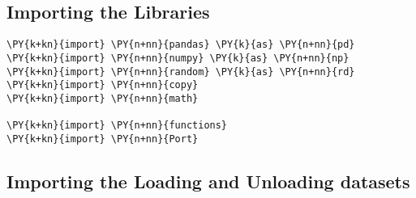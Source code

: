 \sloppy
\hypersetup{
  breaklinks=true,  %
  colorlinks=true,
  urlcolor=urlcolor,
  linkcolor=linkcolor,
  citecolor=citecolor,
  }


\subsection*{Importing the Libraries}\label{importing-the-libraries}

\begin{tcolorbox}[breakable, size=fbox, boxrule=1pt, pad at break*=1mm,colback=cellbackground, colframe=cellborder]
\begin{Verbatim}[commandchars=\\\{\}]
\PY{k+kn}{import} \PY{n+nn}{pandas} \PY{k}{as} \PY{n+nn}{pd}
\PY{k+kn}{import} \PY{n+nn}{numpy} \PY{k}{as} \PY{n+nn}{np}
\PY{k+kn}{import} \PY{n+nn}{random} \PY{k}{as} \PY{n+nn}{rd}
\PY{k+kn}{import} \PY{n+nn}{copy}
\PY{k+kn}{import} \PY{n+nn}{math}

\PY{k+kn}{import} \PY{n+nn}{functions}
\PY{k+kn}{import} \PY{n+nn}{Port}
\end{Verbatim}
\end{tcolorbox}

\subsection*{Importing the Loading and Unloading
datasets}\label{importing-the-loading-and-unloading-datasets}

